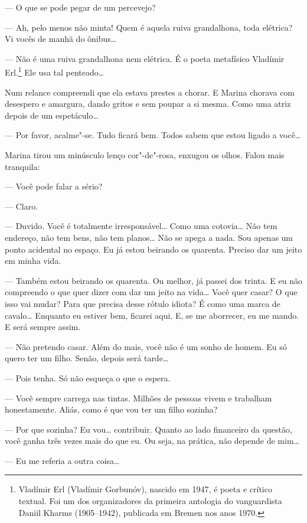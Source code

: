 --- O que se pode pegar de um percevejo?

--- Ah, pelo menos não minta! Quem é aquela ruiva grandalhona, toda
elétrica? Vi vocês de manhã do ônibus\ldots{}

--- Não é uma ruiva grandalhona nem elétrica. É o poeta metafísico
Vladímir Erl.\footnote{Vladímir Erl (Vladímir Gorbunóv), nascido em
  1947, é poeta e crítico textual. Foi um dos organizadores da primeira
  antologia do vanguardista Daniil Kharms (1905--1942), publicada
  em Bremen nos anos 1970.} Ele usa tal penteado\ldots{}

Num relance compreendi que ela estava prestes a chorar. E Marina chorava
com desespero e amargura, dando gritos e sem poupar a si mesma. Como uma
atriz depois de um espetáculo\ldots{}

--- Por favor, acalme"-se. Tudo ficará bem. Todos sabem que estou ligado
a você\ldots{}

Marina tirou um minúsculo lenço cor"-de"-rosa, enxugou os olhos. Falou
mais tranquila:

--- Você pode falar a sério?

--- Claro.

--- Duvido. Você é totalmente irresponsável\ldots{} Como uma cotovia\ldots{} Não
tem endereço, não tem bens, não tem planos\ldots{} Não se apega a nada. Sou
apenas um ponto acidental no espaço. Eu já estou beirando os quarenta.
Preciso dar um jeito em minha vida.

--- Também estou beirando os quarenta. Ou melhor, já passei dos trinta.
E eu não compreendo o que quer dizer com dar um jeito na vida\ldots{} Você
quer casar? O que isso vai mudar? Para que precisa desse rótulo idiota?
É como uma marca de cavalo\ldots{} Enquanto eu estiver bem, ficarei aqui. E,
se me aborrecer, eu me mando. E será sempre assim.

--- Não pretendo casar. Além do mais, você não é um sonho de homem. Eu
só quero ter um filho. Senão, depois será tarde\ldots{}

--- Pois tenha. Só não esqueça o que o espera.

--- Você sempre carrega nas tintas. Milhões de pessoas vivem e trabalham
honestamente. Aliás, como é que vou ter um filho sozinha?

--- Por que sozinha? Eu vou\ldots{} contribuir. Quanto ao lado financeiro da
questão, você ganha três vezes mais do que eu. Ou seja, na prática, não
depende de mim\ldots{}

--- Eu me referia a outra coisa\ldots{}

